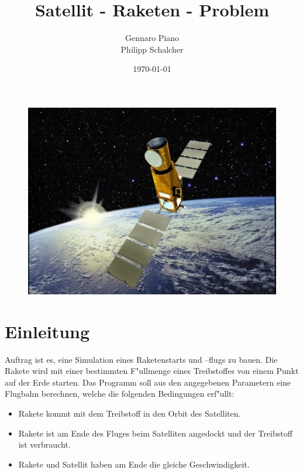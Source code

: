 \documentclass[11pt]{report}
\begin{document}
\begin{titlepage}
\title{Satellit - Raketen - Problem}
\begin{figure}[t]
\centering
\includegraphics{corot-Ausschnitt-klein.jpg}
\label{title}
\end{figure}
\author{Gennaro Piano \\ Philipp Schalcher}
\date{\today}
\maketitle
\end{titlepage}
	
\tableofcontents
\newpage

\chapter{Einleitung}
Auftrag ist es, eine Simulation eines Raketenstarts und –flugs zu bauen. Die Rakete wird mit einer bestimmten F"ullmenge eines Treibstoffes von einem Punkt auf der Erde starten. Das Programm soll aus den angegebenen Parametern eine Flugbahn berechnen, welche die folgenden Bedingungen erf"ullt:
	
\begin{itemize}
\item Rakete kommt mit dem Treibstoff in den Orbit des Satelliten.
\item Rakete ist am Ende des Fluges beim Satelliten angedockt und der Treibstoff ist verbraucht.
\item Rakete und Satellit haben am Ende die gleiche Geschwindigkeit.
\end{itemize}
\end{document}
